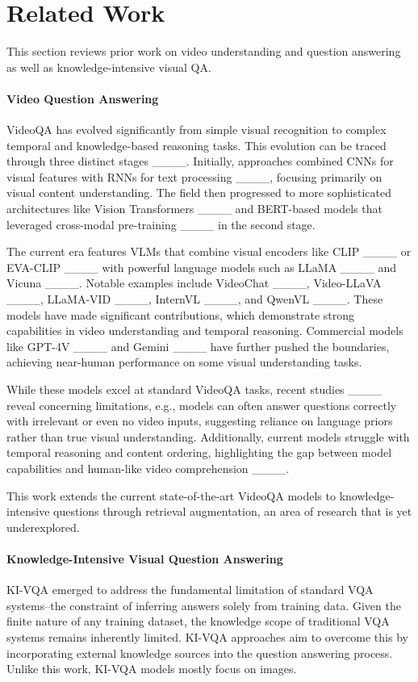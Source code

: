\section{Related Work}
This section reviews prior work on video understanding and question answering as well as knowledge-intensive visual QA.

\paragraph{\textbf{Video Question Answering}}
VideoQA has evolved significantly from simple visual recognition to complex temporal and knowledge-based reasoning tasks. This evolution can be traced through three distinct stages ____. Initially, approaches combined CNNs for visual features with RNNs for text processing ____, focusing primarily on visual content understanding. The field then progressed to more sophisticated architectures like Vision Transformers ____ and BERT-based models that leveraged cross-modal pre-training ____ in the second stage.

The current era features VLMs that combine visual encoders like CLIP ____ or EVA-CLIP ____ with powerful language models such as LLaMA ____ and Vicuna ____. Notable examples include VideoChat ____, Video-LLaVA ____, LLaMA-VID ____, InternVL ____, and QwenVL ____. These models have made significant contributions, which demonstrate strong capabilities in video understanding and temporal reasoning. Commercial models like GPT-4V ____ and Gemini ____ have further pushed the boundaries, achieving near-human performance on some visual understanding tasks.

While these models excel at standard VideoQA tasks, recent studies ____ reveal concerning limitations, e.g., models can often answer questions correctly with irrelevant or even no video inputs, suggesting reliance on language priors rather than true visual understanding. Additionally, current models struggle with temporal reasoning and content ordering, highlighting the gap between model capabilities and human-like video comprehension ____.

This work extends the current state-of-the-art VideoQA models to knowledge-intensive questions through retrieval augmentation, an area of research that is yet underexplored.

\paragraph{\textbf{Knowledge-Intensive Visual Question Answering}}
KI-VQA emerged to address the fundamental limitation of standard VQA systems--the constraint of inferring answers solely from training data. Given the finite nature of any training dataset, the knowledge scope of traditional VQA systems remains inherently limited. KI-VQA approaches aim to overcome this by incorporating external knowledge sources into the question answering process. Unlike this work, KI-VQA models mostly focus on images.

